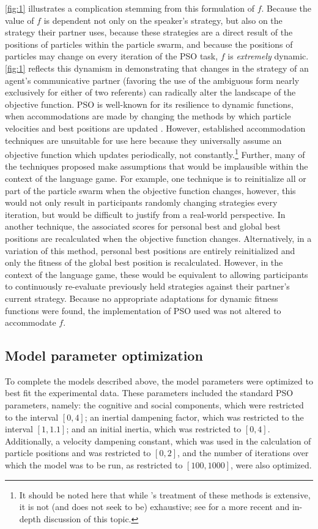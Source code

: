 \documentclass[11pt]{article}
\begin{document}
\autoref{fig:1} illustrates a complication stemming from this formulation of $f$. Because the value of $f$ is dependent not only on the speaker's strategy, but also on the strategy their partner uses, because these strategies are a direct result of the positions of particles within the particle swarm, and because the positions of particles may change on every iteration of the PSO task, $f$ is \textit{extremely} dynamic. \autoref{fig:1} reflects this dynamism in demonstrating that changes in the strategy of an agent's communicative partner (favoring the use of the ambiguous form nearly exclusively for either of two referents) can radically alter the landscape of the objective function. PSO is well-known for its resilience to dynamic functions, when accommodations are made by changing the methods by which particle velocities and best positions are updated \citep{engelbrecht2005}. However, established accommodation techniques \citep{engelbrecht2005} are unsuitable for use here because they universally assume an objective function which updates periodically, not constantly.\footnote{It should be noted here that while \citeauthor{engelbrecht2005}'s treatment of these methods is extensive, it is not (and does not seek to be) exhaustive; see \cite{blackwell2007} for a more recent and in-depth discussion of this topic.} Further, many of the techniques proposed make assumptions that would be implausible within the context of the \citeauthor{rohde2012} language game. For example, one technique is to reinitialize all or part of the particle swarm when the objective function changes, however, this would not only result in participants randomly changing strategies every iteration, but would be difficult to justify from a real-world perspective. In another technique, the associated scores for personal best and global best positions are recalculated when the objective function changes. Alternatively, in a variation of this method, personal best positions are entirely reinitialized and only the fitness of the global best position is recalculated. However, in the context of the language game, these would be equivalent to allowing participants to continuously re-evaluate previously held strategies against their partner's current strategy. Because no appropriate adaptations for dynamic fitness functions were found, the implementation of PSO used was not altered to accommodate $f$.

\subsection{Model parameter optimization}
\label{sec:param_opt}
To complete the models described above, the model parameters were optimized to best fit the experimental data. These parameters included the standard PSO parameters, namely: the cognitive and social components, which were restricted to the interval $[0,4]$; an inertial dampening factor, which was restricted to the interval $[1,1.1]$; and an initial inertia, which was restricted to $[0,4]$. Additionally, a velocity dampening constant, which was used in the calculation of particle positions and was restricted to $[0,2]$, and the number of iterations over which the model was to be run, as restricted to $[100,1000]$, were also optimized.
\end{document}
